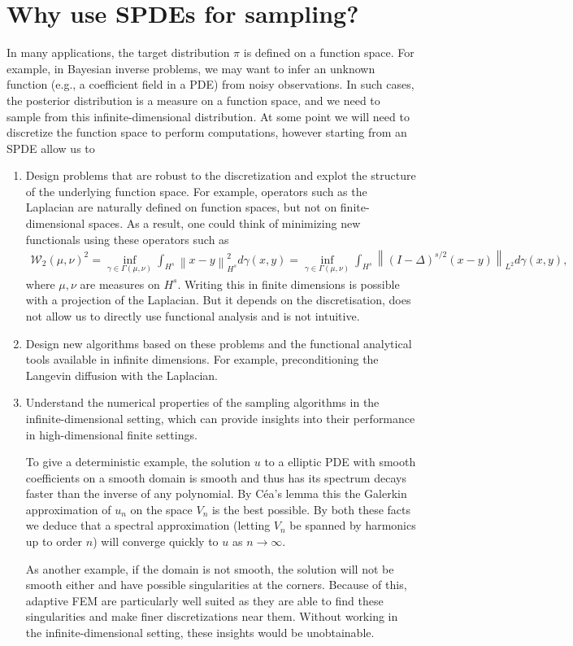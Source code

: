 \documentclass[
    a4paper,
    DIV=14,
    abstract=true,
    numbers=noenddot
]
{scrartcl}
\theoremstyle{definition}
\renewcommand{\norm}[1]{\left\lVert #1 \right\rVert}\renewcommand{\abs}[1]{\left| #1 \right|}
\newcommand{\Ww}{\mathcal{W}}
\begin{document}
\section{Why use SPDEs for sampling?}
In many applications, the target distribution $\pi$ is defined on a function space. For example, in Bayesian inverse problems, we may want to infer an unknown function (e.g., a coefficient field in a PDE) from noisy observations. In such cases, the posterior distribution is a measure on a function space, and we need to sample from this infinite-dimensional distribution. At some point we will need to discretize the function space to perform computations, however starting from an SPDE allow us to 
\begin{enumerate}
    \item Design problems that are robust to the discretization and explot the structure of the underlying function space. For example, operators such as the Laplacian are naturally defined on function spaces, but not on finite-dimensional spaces. As a result, one could think of minimizing new functionals using these operators such as
    \begin{align*}
        \Ww _2(\mu, \nu)^2 = \inf_{\gamma \in \Gamma(\mu, \nu)} \int_{H^s} \norm{x-y}_{H^{s}}^2 d\gamma(x,y) = \inf_{\gamma \in \Gamma(\mu, \nu)} \int_{H^s} \norm{(I-\Delta)^{s/2}(x-y)}_{L^2} d\gamma(x,y),
    \end{align*}
    where $\mu ,\nu$ are measures on $H^s$. Writing this in finite dimensions is possible with a projection of the Laplacian. But it depends on the discretisation, does not allow us to directly use functional analysis and is not intuitive.
    \item Design new algorithms based on these problems and the functional analytical tools available in infinite dimensions. For example, preconditioning the Langevin diffusion with the Laplacian.

    \item Understand the numerical properties of the sampling algorithms in the infinite-dimensional setting, which can provide insights into their performance in high-dimensional finite settings. 
    
    To give a deterministic example, the solution $u$  to a elliptic PDE with smooth coefficients on a smooth domain is smooth and thus has its spectrum decays faster than the inverse of any polynomial. By Céa's lemma this the Galerkin approximation of $u_n$ on the space $V_n$ is the best possible. By both these facts  we deduce that a spectral approximation (letting $V_n$ be spanned by harmonics up to order $n$) will converge quickly to $u$ as $n \to \infty$. 
    
    As another example, if the domain is not smooth, the solution will not be smooth either and have possible singularities at the corners. Because of this, adaptive FEM are particularly well suited as they are able to find these singularities and make finer discretizations near them. Without working in the infinite-dimensional setting, these insights would be unobtainable.
\end{enumerate}



\end{document}
